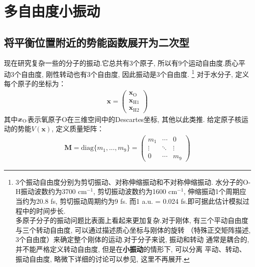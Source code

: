 \chapter{多自由度小振动}
    \section{将平衡位置附近的势能函数展开为二次型}
    现在研究复杂一些的分子的振动.它总共有3个原子, 所以有9个运动自由度.质心平动3个自由度, 
    刚性转动也有3个自由度, 因此振动是3个自由度.
    \footnote{
    3个振动自由度分别为剪切振动、对称伸缩振动和不对称伸缩振动.
    水分子的O-H振动波数约为3700 cm$^{-1}$, 剪切振动波数约为1600 cm$^{-1}$, 
    伸缩振动1个周期应当约为20.8 fs, 剪切振动周期约为9 fs. 而1 a.u. = 0.024 fs.即可据此估计模拟过程中的时间步长.\\
    多原子分子的振动问题比表面上看起来更加复杂.对于刚体, 
    有三个平动自由度与三个转动自由度, 可以通过描述质心坐标与刚体的旋转
    （特殊正交矩阵描述, 3个自由度）来确定整个刚体的运动.对于分子来说, 振动和转动
    通常是耦合的, 并不能严格定义转动自由度, 但是在\textbf{小振动}的情形下, 可以分离
    平动、转动、振动自由度, 略微下详细的讨论可以参见\cite{Landau2007mechanics}, 
    这里不再展开.
    }
    对于水分子, 定义每个原子的坐标为：
    \begin{equation}
        \begin{split}
        \bm{x} = 
        \begin{pmatrix}
            \bm{x}_\mathrm{O}\\
            \bm{x}_{\mathrm{H1}}\\
            \bm{x}_{\mathrm{H2}}
        \end{pmatrix}
    \end{split}
    \end{equation}
    其中$\bm{x}_{\mathrm{O}}$表示氧原子O在三维空间中的Descartes坐标, 其他以此类推.
    给定原子核运动的势能$V(\bm{x})$, 定义质量矩阵：
    \begin{equation}
        \begin{split}
        \bm{M} = \mathrm{diag} \{m_1,...,m_9 \} = 
        \begin{pmatrix}
            m_1 & \cdots & 0\\
            \vdots & \ddots & \vdots\\
            0 & \cdots & m_9
        \end{pmatrix}
        \label{mass matrix}
    \end{split}
    \end{equation}
